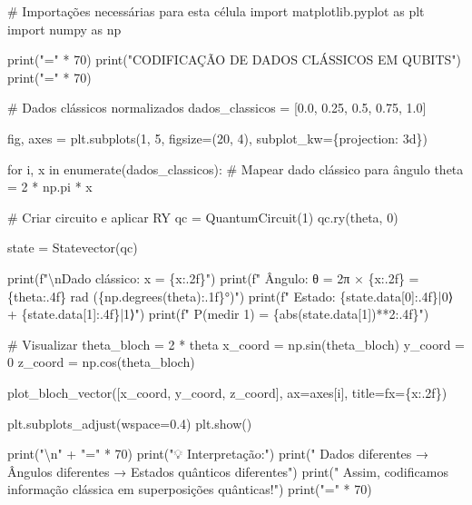 \documentclass[
  brazilian,
]{report}
\newenvironment{Shaded}{\begin{snugshade}}{\end{snugshade}}
\newcommand{\NormalTok}[1]{\textcolor[rgb]{0.00,0.23,0.31}{#1}}
\begin{document}
\begin{Shaded}
\begin{Highlighting}[]
\NormalTok{\# Importações necessárias para esta célula}
\NormalTok{import matplotlib.pyplot as plt}
\NormalTok{import numpy as np}

\NormalTok{print("=" * 70)}
\NormalTok{print("CODIFICAÇÃO DE DADOS CLÁSSICOS EM QUBITS")}
\NormalTok{print("=" * 70)}

\NormalTok{\# Dados clássicos normalizados}
\NormalTok{dados\_classicos = [0.0, 0.25, 0.5, 0.75, 1.0]}

\NormalTok{fig, axes = plt.subplots(1, 5, figsize=(20, 4), subplot\_kw=\{\textquotesingle{}projection\textquotesingle{}: \textquotesingle{}3d\textquotesingle{}\})}

\NormalTok{for i, x in enumerate(dados\_classicos):}
\NormalTok{    \# Mapear dado clássico para ângulo}
\NormalTok{    theta = 2 * np.pi * x}
    
\NormalTok{    \# Criar circuito e aplicar RY}
\NormalTok{    qc = QuantumCircuit(1)}
\NormalTok{    qc.ry(theta, 0)}
    
\NormalTok{    state = Statevector(qc)}
    
\NormalTok{    print(f"\textbackslash{}nDado clássico: x = \{x:.2f\}")}
\NormalTok{    print(f"  Ângulo: θ = 2π × \{x:.2f\} = \{theta:.4f\} rad (\{np.degrees(theta):.1f\}°)")}
\NormalTok{    print(f"  Estado: \{state.data[0]:.4f\}|0⟩ + \{state.data[1]:.4f\}|1⟩")}
\NormalTok{    print(f"  P(medir 1) = \{abs(state.data[1])**2:.4f\}")}
    
\NormalTok{    \# Visualizar}
\NormalTok{    theta\_bloch = 2 * theta}
\NormalTok{    x\_coord = np.sin(theta\_bloch)}
\NormalTok{    y\_coord = 0}
\NormalTok{    z\_coord = np.cos(theta\_bloch)}
    
\NormalTok{    plot\_bloch\_vector([x\_coord, y\_coord, z\_coord], ax=axes[i], }
\NormalTok{                     title=f\textquotesingle{}x=\{x:.2f\}\textquotesingle{})}

\NormalTok{plt.subplots\_adjust(wspace=0.4)}
\NormalTok{plt.show()}

\NormalTok{print("\textbackslash{}n" + "=" * 70)}
\NormalTok{print("💡 Interpretação:")}
\NormalTok{print("   Dados diferentes → Ângulos diferentes → Estados quânticos diferentes")}
\NormalTok{print("   Assim, codificamos informação clássica em superposições quânticas!")}
\NormalTok{print("=" * 70)}
\end{Highlighting}
\end{Shaded}
\end{document}
